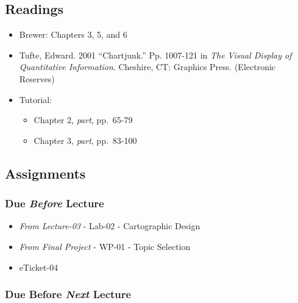 \documentclass[]{book}
\providecommand{\tightlist}{%
  \setlength{\itemsep}{0pt}\setlength{\parskip}{0pt}}
\begin{document}
\hypertarget{readings-5}{%
\subsection*{Readings}\label{readings-5}}

\begin{itemize}
\tightlist
\item
  Brewer: Chapters 3, 5, and 6
\item
  Tufte, Edward. 2001 ``Chartjunk.'' Pp. 1007-121 in \emph{The Visual Display of Quantitative Information}. Cheshire, CT: Graphics Press. (Electronic Reserves)
\item
  Tutorial:

  \begin{itemize}
  \tightlist
  \item
    Chapter 2, \emph{part}, pp.~65-79
  \item
    Chapter 3, \emph{part}, pp.~83-100
  \end{itemize}
\end{itemize}

\hypertarget{assignments-5}{%
\subsection*{Assignments}\label{assignments-5}}

\hypertarget{due-before-lecture-3}{%
\subsubsection*{\texorpdfstring{Due \emph{Before} Lecture}{Due Before Lecture}}\label{due-before-lecture-3}}

\begin{itemize}
\tightlist
\item
  \emph{From Lecture-03} - Lab-02 - Cartographic Design
\item
  \emph{From Final Project} - WP-01 - Topic Selection
\item
  eTicket-04
\end{itemize}

\hypertarget{due-before-next-lecture-2}{%
\subsubsection*{\texorpdfstring{Due Before \emph{Next} Lecture}{Due Before Next Lecture}}\label{due-before-next-lecture-2}}
\end{document}
